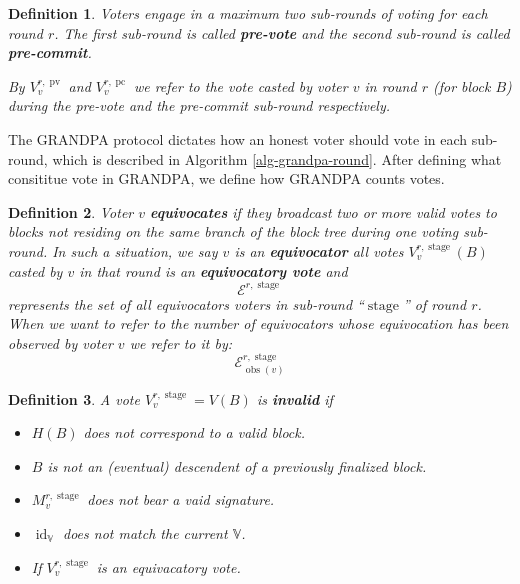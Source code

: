 \documentclass{article}
\newcommand{\tmop}[1]{\ensuremath{\operatorname{#1}}}
\newcommand{\tmstrong}[1]{\textbf{#1}}
\newcommand{\tmtextbf}[1]{{\bfseries{#1}}}
\newenvironment{itemizedot}{\begin{itemize} \renewcommand{\labelitemi}{$\bullet$}\renewcommand{\labelitemii}{$\bullet$}\renewcommand{\labelitemiii}{$\bullet$}\renewcommand{\labelitemiv}{$\bullet$}}{\end{itemize}}
\newtheorem{definition}{Definition}
\providecommand{\tmop}[1]{\ensuremath{\mathrm{#1}}}
\providecommand{\tmstrong}[1]{\tmtextbf{#1}}
\providecommand{\tmtextbf}[1]{\tmtextbf{#1}}
\newtheorem{definition}{Definition}
\begin{document}
\begin{definition}
  Voters engage in a maximum two sub-rounds of voting for each round $r$. The
  first sub-round is called {\tmstrong{pre-vote}} and the second sub-round is
  called {\tmstrong{pre-commit}}.
  
  By {\tmstrong{$V_v^{r, \tmop{pv}}$}} and {\tmstrong{$V_v^{r, \tmop{pc}}$}}
  we refer to the vote casted by voter $v$ in round $r$ (for block $B$) during
  the pre-vote and the pre-commit sub-round respectively.
\end{definition}

The GRANDPA protocol dictates how an honest voter should vote in each
sub-round, which is described in Algorithm \ref{alg-grandpa-round}. After
defining what consititue vote in GRANDPA, we define how GRANDPA counts votes.

\begin{definition}
  Voter $v$ {\tmstrong{equivocates}} if they broadcast two or more valid votes
  to blocks not residing on the same branch of the block tree during one
  voting sub-round. In such a situation, we say $v$ is an
  {\tmstrong{equivocator}} all votes $V_v^{r, \tmop{stage}} (B)$ casted by $v$
  in that round is an {\tmstrong{equivocatory vote}} and
  \[ \mathcal{E}^{r, \tmop{stage}} \]
  represents the set of all equivocators voters in sub-round
  ``$\tmop{stage}$'' of round $r$. When we want to refer to the number of
  equivocators whose equivocation has been observed by voter $v$ we refer to
  it by:
  \[ \mathcal{E}^{r, \tmop{stage}}_{\tmop{obs} (v)} \]
  
\end{definition}

\begin{definition}
  A vote $V_v^{r, \tmop{stage}} = V (B)$ is {\tmstrong{invalid}} if
  \begin{itemize}
    \begin{itemizedot}
      \item $H (B)$ does not correspond to a valid block.
      
      \item $B$ is not an (eventual) descendent of a previously finalized
      block.
      
      \item $M^{r, \tmop{stage}}_v$ does not bear a vaid signature.
      
      \item $\tmop{id}_{\mathbb{V}}$ does not match the current $\mathbb{V}$.
      
      \item If $V_v^{r, \tmop{stage}}$ is an equivacatory vote.
    \end{itemizedot}
  \end{itemize}
\end{definition}
\end{document}
